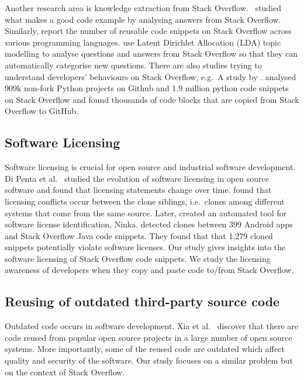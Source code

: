 \documentclass{svjour3}                     %
\begin{document}
Another research area is knowledge extraction from Stack Overflow.
\cite{Nasehi2012}~studied what makes a good code example by analysing answers
from Stack Overflow. Similarly, \cite{Yang2016} report the number of reusable
code snippets on Stack Overflow across various programming languages.
\cite{Wang2013_StackOverflow} use Latent Dirichlet Allocation (LDA) topic
modelling to analyse questions and answers from Stack Overflow so that they can
automatically categorise new questions. There are also studies trying to
understand developers' behaviours on Stack Overflow, e.g.~A study by
\cite{Movshovitz-Attias2013,Rosen2016,Choetkiertikul2015,Bosu2013}.
\cite{Yang2017} analysed 909k non-fork Python projects on Github and 1.9
million python code snippets on Stack Overflow and found thousands of 
code blocks that are copied from Stack Overflow to GitHub.

\subsection{Software Licensing}
Software licensing is crucial for open source and industrial software
development. Di Penta et al.~\cite{DiPenta2010} studied the evolution of
software licensing in open source software and found that licensing statements
change over time. \cite{German2009} found that licensing conflicts occur between
the clone siblings, i.e.~clones among different systems that come from the same
source. Later, \cite{German2010} created an automated tool for software license
identification, Ninka. \cite{An2017} detected clones between 399 Android apps
and Stack Overflow Java code snippets. They found that  that 1,279 cloned
snippets potentially violate software licenses. Our study gives insights into
the software licensing of Stack Overflow code snippets. We study the licensing
awareness of developers when they copy and paste code to/from Stack Overflow.

\subsection{Reusing of outdated third-party source code} 
Outdated code occurs in software development. Xia et al.~\cite{Xia2014} discover
that there are code reused from popular open source projects in a large number
of open source systems. More importantly, some of the reused code are outdated
which affect quality and security of the software. Our study focuses on a
similar problem but on the context of Stack Overflow.
\end{document}
